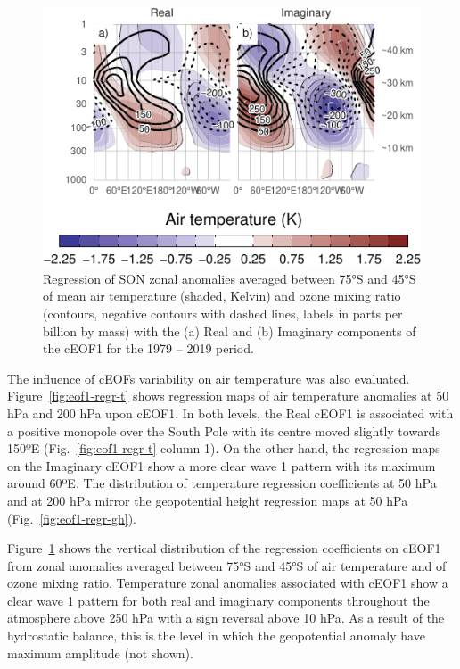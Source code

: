 \documentclass[smallextended]{svjour3}       %
\begin{document}
\begin{figure}
\centering
\includegraphics{../figures/t-vertical-1.pdf}
\caption{\label{fig:t-vertical}Regression of SON zonal anomalies averaged between 75°S and 45°S of mean air temperature (shaded, Kelvin) and ozone mixing ratio (contours, negative contours with dashed lines, labels in parts per billion by mass) with the (a) Real and (b) Imaginary components of the cEOF1 for the 1979 -- 2019 period.}
\end{figure}

The influence of cEOFs variability on air temperature was also evaluated.
Figure~\ref{fig:eof1-regr-t} shows regression maps of air temperature anomalies at 50 hPa and 200 hPa upon cEOF1.
In both levels, the Real cEOF1 is associated with a positive monopole over the South Pole with its centre moved slightly towards 150ºE (Fig.~\ref{fig:eof1-regr-t} column 1).
On the other hand, the regression maps on the Imaginary cEOF1 show a more clear wave 1 pattern with its maximum around 60ºE.
The distribution of temperature regression coefficients at 50 hPa and at 200 hPa mirror the geopotential height regression maps at 50 hPa (Fig.~\ref{fig:eof1-regr-gh}).

Figure~\ref{fig:t-vertical} shows the vertical distribution of the regression coefficients on cEOF1 from zonal anomalies averaged between 75°S and 45°S of air temperature and of ozone mixing ratio.
Temperature zonal anomalies associated with cEOF1 show a clear wave 1 pattern for both real and imaginary components throughout the atmosphere above 250 hPa with a sign reversal above 10 hPa.
As a result of the hydrostatic balance, this is the level in which the geopotential anomaly have maximum amplitude (not shown).
\end{document}
